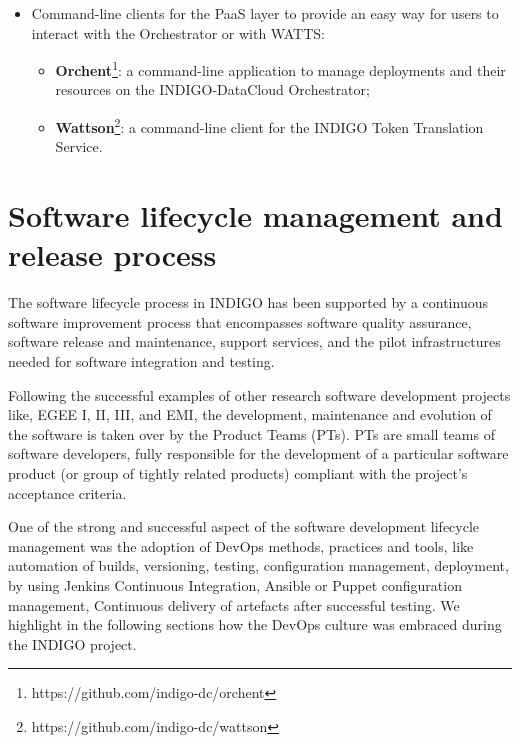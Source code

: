 \documentclass{article}
\begin{document}
\begin{itemize}
\item Command-line clients for the PaaS layer to provide an easy way for users to interact with the Orchestrator or with WATTS:
\begin{itemize}
\item {\bf Orchent}\footnote{https://github.com/indigo-dc/orchent}: a command-line application to manage deployments and their resources on the INDIGO-DataCloud Orchestrator;
\item {\bf Wattson}\footnote{https://github.com/indigo-dc/wattson}: a command-line client for the INDIGO Token Translation Service.
\end{itemize}

\end{itemize}





\section{Software lifecycle management and release process}
\label{sec:release}

The software lifecycle process in INDIGO has
been supported by a continuous software improvement process that
encompasses software quality assurance, software
release and maintenance, support services, and the pilot infrastructures needed
for software integration and testing.

Following the successful examples of other research software
development projects like, EGEE I, II, III, and EMI, the development,
maintenance and evolution of the software is taken over by the Product Teams (PTs). PTs are small teams of software developers, fully responsible for the development of a particular software product (or group of tightly related products) compliant with the project's acceptance criteria.


One of the strong and successful aspect of the software development lifecycle management was the adoption of DevOps methods, practices and tools, like automation of builds, versioning, testing, configuration management, deployment, by using Jenkins Continuous Integration, Ansible or Puppet configuration management, Continuous delivery of artefacts after successful testing. We highlight in the following sections how the DevOps culture was embraced during the INDIGO project. 
\end{document}
